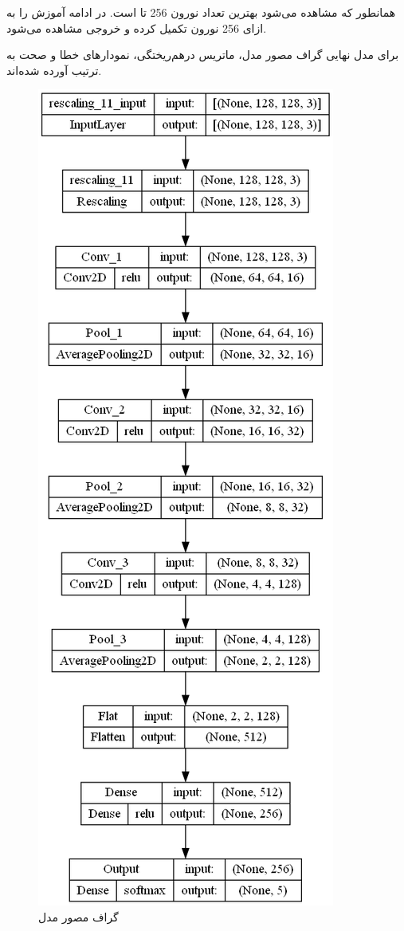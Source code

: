\documentclass{article}
\begin{document}
\cleardoublepage

همانطور که مشاهده می‌شود بهترین تعداد نورون 256 تا است. در ادامه آموزش را به ازای 256 نورون تکمیل کرده و خروجی مشاهده می‌شود.

برای مدل نهایی گراف مصور مدل، ماتریس درهم‌ریختگی، نمودارهای خطا و صحت به ترتیب آورده شده‌اند.

\begin{figure}[!h]
    \centering\includegraphics[scale=.45]{./p6-1}
    \caption{گراف مصور مدل}\label{fig.61}
\end{figure}
\end{document}
